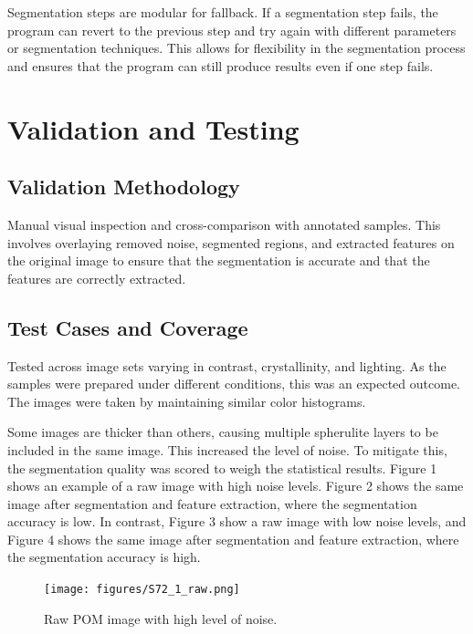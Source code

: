 \documentclass[12pt]{article}
\begin{document}
Segmentation steps are modular for fallback. If a segmentation step fails, the program can revert to the previous step and 
try again with different parameters or segmentation techniques.
This allows for flexibility in the segmentation process and ensures that the program can still produce results even if one 
step fails.

\section{Validation and Testing}

\subsection{Validation Methodology}
Manual visual inspection and cross-comparison with annotated samples. This involves overlaying removed noise, segmented regions, and
extracted features on the original image to ensure that the segmentation is accurate and that the features are correctly extracted.

\subsection{Test Cases and Coverage}
Tested across image sets varying in contrast, crystallinity, and lighting. As the samples were prepared under different conditions, 
this was an expected outcome. The images were taken by maintaining similar color histograms. 

Some images are thicker than others, causing multiple spherulite layers to be included in the same image. This increased the level of 
noise. To mitigate this, the segmentation quality was scored to weigh the statistical results. Figure 1 shows an 
example of a raw image with high noise levels. Figure 2 shows the same image after segmentation and feature extraction, where the 
segmentation accuracy is low. In contrast, Figure 3 show a raw image with low noise levels, and Figure 4 shows the same image after 
segmentation and feature extraction, where the segmentation accuracy is high.

\begin{figure}[H]
    \centering
    \texttt{[image: figures/S72\_1\_raw.png]}
    \caption{\centering Raw POM image with high level of noise.}
\end{figure}
\end{document}
